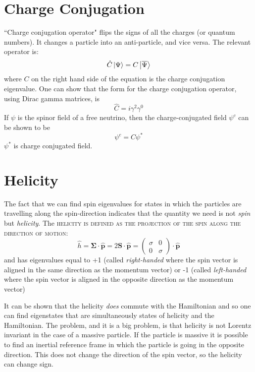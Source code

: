 \section{\label{sec:charge_conjugation}Charge Conjugation}
``Charge conjugation operator" flips the signs of all the charges (or quantum numbers). It changes a particle into an anti-particle, and vice versa. The relevant operator is:
\begin{equation}
    \hat{C} \ket{\Psi} = C \ket{\overline {\Psi}}
\end{equation}
where $C$ on the right hand side of the equation is the charge conjugation eigenvalue. One can show that the form for the charge conjugation operator, using Dirac gamma matrices, is
\begin{equation}
    \hat{C} = i \gamma ^2 \gamma ^0
\end{equation}
If \(\psi\) is the spinor field of a free neutrino, then the charge-conjugated field \(\psi^c\) can be shown to be
\begin{equation}
    \psi^c = C \psi ^*
\end{equation}
\(\psi ^*\) is charge conjugated field. \cite{boyd}
\section{\label{sec:helicity}Helicity}
The fact that we can find spin eigenvalues for states in which the particles are travelling along the spin-direction indicates that the quantity we need is not \textit{spin} but \textit{helicity}. The \textsc{helicity is defined as the projection of the spin along the direction of motion}:
\begin{equation}
    \hat{h} = \bm{\Sigma} \cdot \hat{\bm{p}}  = 2 \bm{S}\cdot\hat{\bm{p}} = \begin{pmatrix}
        \sigma & 0\\
        0 & \sigma
    \end{pmatrix} \cdot \hat{\bm{p}}
\end{equation}
and has eigenvalues equal to +1 (called \textit{right-handed} where the spin vector is aligned in the same
direction as the momentum vector) or -1 (called \textit{left-handed} where the spin vector is aligned in the opposite direction as the momentum vector)

It can be shown that the helicity \textit{does} commute with the Hamiltonian and so one can find eigenstates that are simultaneously states of helicity and the Hamiltonian. The problem, and it is a big problem, is that helicity is not Lorentz invariant in the case of a massive particle. If the particle is massive it is possible to find an inertial reference frame in which the particle is going in the opposite direction. This does not change the direction of the spin vector, so the helicity can change sign.

